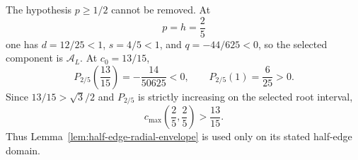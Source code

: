 \begin{remark}
The hypothesis $p\ge1/2$ cannot be removed.  At
\[
 p=h=\frac25
\]
one has $d=12/25<1$, $s=4/5<1$, and $q=-44/625<0$, so the selected component
is $\mathcal A_L$.  At $c_0=13/15$,
\[
 P_{2/5}\left(\frac{13}{15}\right)
 =-\frac{14}{50625}<0,
 \qquad
 P_{2/5}(1)=\frac6{25}>0.
\]
Since $13/15>\sqrt3/2$ and $P_{2/5}$ is strictly increasing on the selected
root interval,
\[
 c_{\max}\left(\frac25,\frac25\right)>\frac{13}{15}.
\]
Thus Lemma~\ref{lem:half-edge-radial-envelope} is used only on its stated
half-edge domain.
\end{remark}
